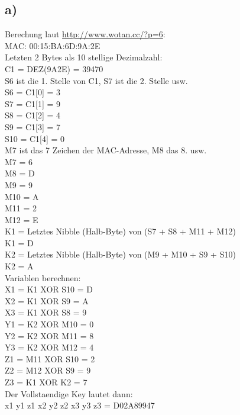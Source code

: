 \documentclass[10pt,a4paper]{article}
\begin{document}
\subsection*{a)}
Berechung laut \href{http://www.wotan.cc/?p=6}{http://www.wotan.cc/?p=6}:\\
MAC: 00:15:BA:6D:9A:2E\\
Letzten 2 Bytes als 10 stellige Dezimalzahl:\\
C1 = DEZ(9A2E) = 39470\\
 
S6 ist die 1. Stelle von C1, S7 ist die 2. Stelle usw.\\
S6 = C1[0] = 3 \\
S7 = C1[1] = 9 \\
S8 = C1[2] = 4 \\
S9 = C1[3] = 7 \\
S10 = C1[4] = 0 \\
 
M7 ist das 7 Zeichen der MAC-Adresse, M8 das 8. usw.\\
M7 =  6 \\
M8 =  D \\
M9 =  9 \\
M10 =  A \\
M11 =  2 \\
M12 =  E \\

K1 = Letztes Nibble (Halb-Byte) von (S7 + S8 + M11 + M12)\\
K1 =  D \\

K2 = Letztes Nibble (Halb-Byte) von (M9 + M10 + S9 + S10)\\
K2 =  A \\

Variablen berechnen:\\
X1 = K1  XOR S10 =  D \\
X2 = K1  XOR S9  =  A \\
X3 = K1  XOR S8  =  9 \\
Y1 = K2  XOR M10 =  0 \\
Y2 = K2  XOR M11 =  8 \\
Y3 = K2  XOR M12 =  4 \\
Z1 = M11 XOR S10 =  2 \\
Z2 = M12 XOR S9  =  9 \\
Z3 = K1  XOR K2  =  7 \\
 
Der Vollstaendige Key lautet dann:\\
x1 y1 z1 x2 y2 z2 x3 y3 z3 = D02A89947 \\\\
\end{document}
